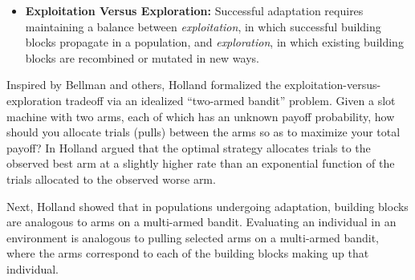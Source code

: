 \documentclass{sig-alternate}
\begin{document}
\begin{itemize}


\item{\bf Exploitation Versus Exploration:} Successful adaptation
  requires maintaining a balance between \emph{exploitation}, in which
  successful building blocks propagate in a population, and
  \emph{exploration}, in which existing building blocks are recombined
  or mutated in new ways.

\end{itemize} 

Inspired by Bellman \cite{Bellman1961} and
others, Holland formalized the exploitation-versus-exploration tradeoff
via an idealized ``two-armed bandit'' problem. Given a slot machine
with two arms, each of which has an unknown payoff probability, how
should you allocate trials (pulls) between the arms so as to
maximize your total payoff?   In \cite{Holland1973,Holland1975}
Holland argued that the optimal strategy
allocates trials to the observed best arm at a slightly higher rate than
an exponential function of the trials allocated to the observed worse arm.  

Next, Holland showed that in populations undergoing adaptation,
building blocks are analogous to arms on a multi-armed bandit.  
Evaluating an individual in an environment is analogous to pulling selected
arms on a multi-armed bandit, where the arms correspond to each of the
building blocks making up that individual.
\end{document}
